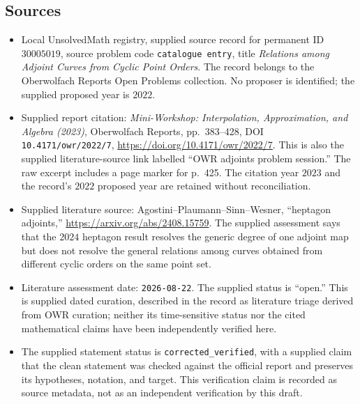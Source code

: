 \documentclass[11pt]{article}
\begin{document}
\subsection{Sources}
\begin{itemize}
\item Local UnsolvedMath registry, supplied source record for permanent ID \(30005019\), source problem code \texttt{catalogue entry}, title \emph{Relations among Adjoint Curves from Cyclic Point Orders}. The record belongs to the Oberwolfach Reports Open Problems collection. No proposer is identified; the supplied proposed year is \(2022\).
\item Supplied report citation: \emph{Mini-Workshop: Interpolation, Approximation, and Algebra (2023)}, Oberwolfach Reports, pp.~383--428, DOI \texttt{10.4171/owr/2022/7}, \url{https://doi.org/10.4171/owr/2022/7}. This is also the supplied literature-source link labelled ``OWR adjoints problem session.'' The raw excerpt includes a page marker for p.~425. The citation year \(2023\) and the record's \(2022\) proposed year are retained without reconciliation.
\item Supplied literature source: Agostini--Plaumann--Sinn--Wesner, ``heptagon adjoints,'' \url{https://arxiv.org/abs/2408.15759}. The supplied assessment says that the \(2024\) heptagon result resolves the generic degree of one adjoint map but does not resolve the general relations among curves obtained from different cyclic orders on the same point set.
\item Literature assessment date: \texttt{2026-08-22}. The supplied status is ``open.'' This is supplied dated curation, described in the record as literature triage derived from OWR curation; neither its time-sensitive status nor the cited mathematical claims have been independently verified here.
\item The supplied statement status is \texttt{corrected\_verified}, with a supplied claim that the clean statement was checked against the official report and preserves its hypotheses, notation, and target. This verification claim is recorded as source metadata, not as an independent verification by this draft.
\end{itemize}
\end{document}
